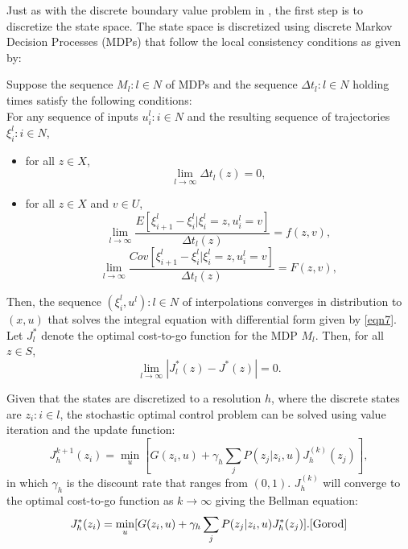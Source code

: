 Just as with the discrete boundary value problem in \cite{bardi2}, the first step is to discretize the state space. The state space is discretized using discrete Markov Decision Processes (MDPs) that follow the local consistency conditions as given by:
\begin{theorem}
Suppose the sequence ${M_l:l \in N}$ of MDPs and the sequence ${\Delta t_l:l \in N}$ holding times satisfy the following conditions:\\
For any sequence of inputs ${u_i^l:i \in N}$ and the resulting sequence of trajectories ${\xi_i^l: i \in N}$,
\begin{itemize}
\item for all $z \in X$, 
\begin{equation*}
\lim\limits_{l \rightarrow \infty} \Delta t_l(z) = 0,
\end{equation*}
\item for all $ z \in X$ and $v \in U$,
\begin{equation*}
\lim\limits_{l \rightarrow \infty} \dfrac{E[\xi_{i+1}^l-\xi_i^l|\xi_i^l =z,u_i^l = v]}{\Delta t_l(z)} = f(z,v),
\end{equation*}
\begin{equation*}
\lim\limits_{l \rightarrow \infty} \dfrac{Cov[\xi_{i+1}^l-\xi_i^l|\xi_i^l =z,u_i^l = v]}{\Delta t_l(z)} = F(z,v),
\end{equation*}
\end{itemize}
Then, the sequence ${(\xi_i^l,u^l):l \in N}$ of interpolations converges in distribution to $(x,u)$ that solves the integral equation with differential form given by \ref{eqn7}. Let $J_l^*$ denote the optimal cost-to-go function for the MDP $M_l$. Then, for all $z \in S$, 
\begin{equation*}
\lim\limits_{l \rightarrow \infty}|J_l^*(z)-J^*(z)| = 0.
\end{equation*}    
\end{theorem}
Given that the states are discretized to a resolution $h$, where the discrete states are ${z_i:i \in l}$, the stochastic optimal control problem can be solved using value iteration and the update function:
\begin{equation}\label{eqn8}
J_h^{k+1}(z_i)= \underset{u }{\operatorname{min }}[G(z_i,u) + \gamma_h \sum_{j}P(z_j|z_i, u)J_h^{(k)}(z_j)],
\end{equation}
in which $\gamma_h$ is the discount rate that ranges from $(0,1)$. $J_h^{(k)}$ will converge to the optimal cost-to-go function as $k \rightarrow \infty$ giving the Bellman equation:
\begin{equation*}
J_h^*(z_i) = \underset{u }{\operatorname{min }}[G(z_i,u) + \gamma_h \sum_{j}P(z_j|z_i,u)J_h^*(z_j)].\cite{Gorod}
\end{equation*} 
  

